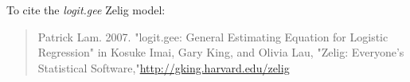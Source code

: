 To cite the \emph{ logit.gee } Zelig model:
 \begin{verse}
 Patrick Lam. 2007. "logit.gee: General Estimating Equation for Logistic Regression" in Kosuke Imai, Gary King, and Olivia Lau, "Zelig: Everyone's Statistical Software,"\url{http://gking.harvard.edu/zelig} 
\end{verse}